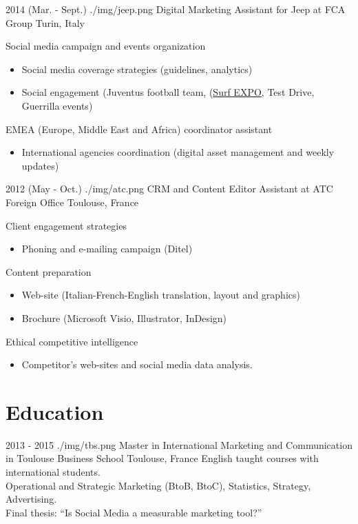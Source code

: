 \documentclass[]{cv}
\begin{document}
\begin{entrylistlogodated}
\entrylogodated
      {2014 \scriptsize{(Mar. - Sept.)}}
       {./img/jeep.png}
      {Digital Marketing Assistant for Jeep\textregistered{} at FCA Group}
      {Turin, Italy}
      {
        Social media campaign and events organization
        \begin{itemize}
        \item Social media coverage strategies (guidelines, analytics)
        \item Social engagement (Juventus football team, (\href{http://www.italiasurfexpo.it}{Surf EXPO}, Test Drive, Guerrilla events)
        \end{itemize}
        EMEA (Europe, Middle East and Africa) coordinator assistant
        \begin{itemize}
        \item International agencies coordination (digital asset management and weekly updates)
        \end{itemize}
      }
\end{entrylistlogodated}

\begin{entrylistlogodated}
\entrylogodated
      {2012 \scriptsize{(May - Oct.)}}
       {./img/atc.png}
      {CRM and Content Editor Assistant at ATC Foreign Office}
      {Toulouse, France}
      {
        Client engagement strategies
        \begin{itemize}
        \item Phoning and e-mailing campaign (Ditel)
        \end{itemize}

        Content preparation
        \begin{itemize}
        \item Web-site (Italian-French-English translation, layout and graphics)
        \item Brochure (Microsoft Visio, Illustrator, InDesign)
        \end{itemize}

        Ethical competitive intelligence
        \begin{itemize}
        \item Competitor's web-sites and social media data analysis.
        \end{itemize}
      }
\end{entrylistlogodated}

\framebreak

\section{Education}
\begin{entrylistlogodated}
\entrylogodated
    {2013 - 2015}
    {./img/tbs.png}
    {Master in International Marketing and Communication in Toulouse Business School}
    {Toulouse, France}
    {
      English taught courses with international students.\\
      Operational and Strategic Marketing (BtoB, BtoC), Statistics, Strategy, Advertising.\\
      Final thesis: ``Is Social Media a measurable marketing tool?''
    }
\end{entrylistlogodated}
\end{document}
